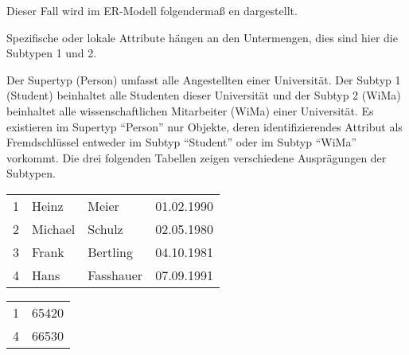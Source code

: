         Dieser Fall wird im ER-Modell folgendermaß en dargestellt.
        \begin{center}
        \end{center}
        \begin{merke}
          Spezifische oder lokale Attribute hängen an den Untermengen, dies sind hier die Subtypen 1 und 2.
        \end{merke}
          Der Supertyp (Person) umfasst alle Angestellten einer Universität.
          Der Subtyp 1 (Student) beinhaltet alle Studenten dieser Universität
          und der Subtyp 2 (WiMa) beinhaltet alle wissenschaftlichen Mitarbeiter
          (WiMa) einer Universität. Es existieren im Supertyp \enquote{Person}
          nur Objekte, deren identifizierendes Attribut als Fremdschlüssel
          entweder im Subtyp \enquote{Student} oder im Subtyp \enquote{WiMa}
          vorkommt. Die drei folgenden Tabellen zeigen verschiedene
          Ausprägungen der Subtypen.
\clearpage
          \begin{supertabular}[h]{llll}
            1 & Heinz & Meier & 01.02.1990 \\
            2 & Michael & Schulz & 02.05.1980 \\
            3 & Frank & Bertling & 04.10.1981 \\
            4 & Hans & Fasshauer & 07.09.1991 \\
          \end{supertabular}

          \begin{supertabular}[h]{lp{5cm}}
            1 & 65420\\
            4 & 66530\\
          \end{supertabular}

